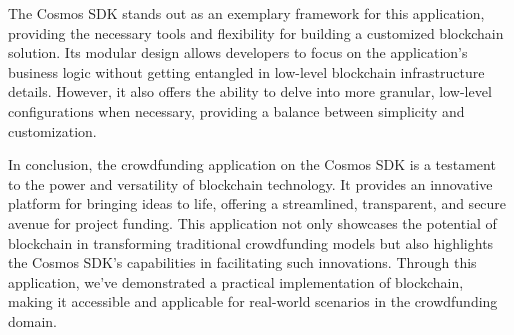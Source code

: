 The Cosmos SDK stands out as an exemplary framework for this application, providing the necessary tools and flexibility for building a customized blockchain solution. Its modular design allows developers to focus on the application's business logic without getting entangled in low-level blockchain infrastructure details. However, it also offers the ability to delve into more granular, low-level configurations when necessary, providing a balance between simplicity and customization.

In conclusion, the crowdfunding application on the Cosmos SDK is a testament to the power and versatility of blockchain technology. It provides an innovative platform for bringing ideas to life, offering a streamlined, transparent, and secure avenue for project funding. This application not only showcases the potential of blockchain in transforming traditional crowdfunding models but also highlights the Cosmos SDK's capabilities in facilitating such innovations. Through this application, we've demonstrated a practical implementation of blockchain, making it accessible and applicable for real-world scenarios in the crowdfunding domain.